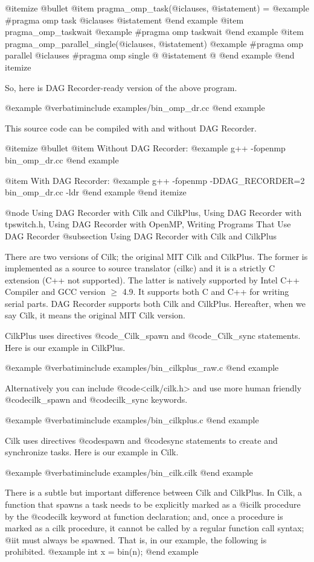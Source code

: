 @itemize @bullet
@item pragma_omp_task(@i{clauses}, @i{statement}) =
@example
#pragma omp task @i{clauses}
  @i{statement}
@end example
@item pragma_omp_taskwait 
@example
#pragma omp taskwait
@end example
@item pragma_omp_parallel_single(@i{clauses}, @i{statement})
@example
#pragma omp parallel @i{clauses}
#pragma omp single
@{
  @i{statement}
@}
@end example
@end itemize

So, here is DAG Recorder-ready version of the above program.

@example
@verbatiminclude examples/bin_omp_dr.cc
@end example

This source code can be compiled with and without DAG Recorder.

@itemize @bullet
@item Without DAG Recorder:
@example
g++ -fopenmp bin_omp_dr.cc 
@end example

@item With DAG Recorder:
@example
g++ -fopenmp -DDAG_RECORDER=2 bin_omp_dr.cc -ldr
@end example
@end itemize

@node Using DAG Recorder with Cilk and CilkPlus, Using DAG Recorder with tpswitch.h, Using DAG Recorder with OpenMP, Writing Programs That Use DAG Recorder
@subsection Using DAG Recorder with Cilk and CilkPlus

There are two versions of Cilk; the original MIT Cilk and CilkPlus.
The former is implemented as a source to source translator (cilkc) and it is a strictly C extension (C++ not supported).
The latter is natively supported by Intel C++ Compiler and GCC version $\geq$ 4.9.  
It supports both C and C++ for writing serial parts.
DAG Recorder supports both Cilk and CilkPlus.
Hereafter, when we say Cilk, it means the original MIT Cilk version.

CilkPlus uses directives @code{_Cilk_spawn} and @code{_Cilk_sync} statements.
Here is our example in CilkPlus.

@example
@verbatiminclude examples/bin_cilkplus_raw.c
@end example

Alternatively you can include @code{<cilk/cilk.h>} and use more human friendly @code{cilk_spawn} and @code{cilk_sync} keywords.

@example
@verbatiminclude examples/bin_cilkplus.c
@end example

Cilk uses directives @code{spawn} and @code{sync} statements to create and synchronize tasks.
Here is our example in Cilk.

@example
@verbatiminclude examples/bin_cilk.cilk
@end example

There is a subtle but important difference between Cilk and CilkPlus.
In Cilk, a function that spawns a task needs to be explicitly marked as
a @i{cilk procedure} by the @code{cilk} keyword at function declaration;
and, once a procedure is marked as a cilk procedure, it cannot be called
by a regular function call syntax; @i{it must always be spawned.}  That is,
in our example, the following is prohibited.
@example
int x = bin(n);
@end example


